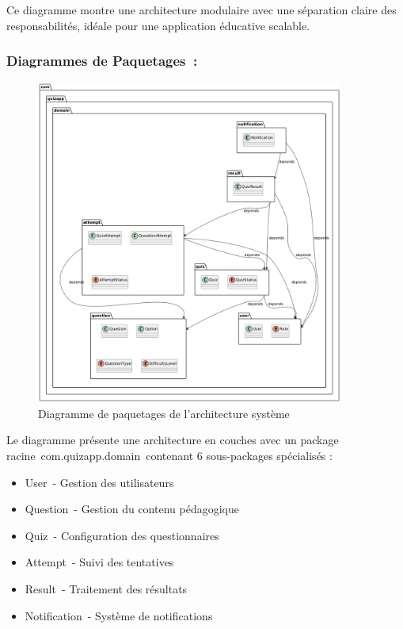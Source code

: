 \documentclass[12pt,a4paper,twoside]{report}
\begin{document}
Ce diagramme montre une architecture modulaire avec une séparation
claire des responsabilités, idéale pour une application éducative
scalable.

\hypertarget{diagrammes-de-paquetages}{%
\subsubsection{Diagrammes de
Paquetages~:}\label{diagrammes-de-paquetages}}

\begin{figure}[H]
\centering
\includegraphics[width=0.9\textwidth]{latex_media/media/image17.png}
\caption{Diagramme de paquetages de l'architecture système}
\label{fig:diagramme-paquetages}
\end{figure}

Le
diagramme présente une architecture en couches avec un package
racine~com.quizapp.domain~contenant 6 sous-packages spécialisés :

\begin{itemize}
\item
  User~- Gestion des utilisateurs
\item
  Question~- Gestion du contenu pédagogique
\item
  Quiz~- Configuration des questionnaires
\item
  Attempt~- Suivi des tentatives
\item
  Result~- Traitement des résultats
\item
  Notification~- Système de notifications
\end{itemize}
\end{document}
